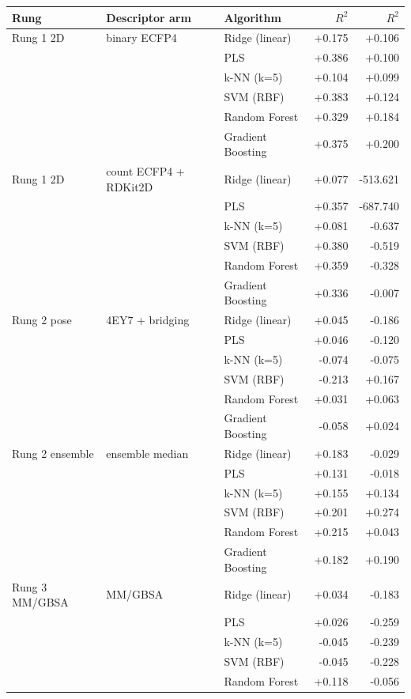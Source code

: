 \begin{tabular}{lllrr}
\toprule
Rung & Descriptor arm & Algorithm & \framingA{} $R^2$ & \framingB{} $R^2$ \\
\midrule
Rung 1 2D & binary ECFP4 & Ridge (linear) & +0.175 & +0.106 \\
 &  & PLS & +0.386 & +0.100 \\
 &  & k-NN (k=5) & +0.104 & +0.099 \\
 &  & SVM (RBF) & +0.383 & +0.124 \\
 &  & Random Forest & +0.329 & +0.184 \\
 &  & Gradient Boosting & +0.375 & +0.200 \\
\addlinespace
Rung 1 2D & count ECFP4 + RDKit2D & Ridge (linear) & +0.077 & -513.621 \\
 &  & PLS & +0.357 & -687.740 \\
 &  & k-NN (k=5) & +0.081 & -0.637 \\
 &  & SVM (RBF) & +0.380 & -0.519 \\
 &  & Random Forest & +0.359 & -0.328 \\
 &  & Gradient Boosting & +0.336 & -0.007 \\
\addlinespace
Rung 2 pose & 4EY7 + bridging & Ridge (linear) & +0.045 & -0.186 \\
 &  & PLS & +0.046 & -0.120 \\
 &  & k-NN (k=5) & -0.074 & -0.075 \\
 &  & SVM (RBF) & -0.213 & +0.167 \\
 &  & Random Forest & +0.031 & +0.063 \\
 &  & Gradient Boosting & -0.058 & +0.024 \\
\addlinespace
Rung 2 ensemble & ensemble median & Ridge (linear) & +0.183 & -0.029 \\
 &  & PLS & +0.131 & -0.018 \\
 &  & k-NN (k=5) & +0.155 & +0.134 \\
 &  & SVM (RBF) & +0.201 & +0.274 \\
 &  & Random Forest & +0.215 & +0.043 \\
 &  & Gradient Boosting & +0.182 & +0.190 \\
\addlinespace
Rung 3 MM/GBSA & MM/GBSA & Ridge (linear) & +0.034 & -0.183 \\
 &  & PLS & +0.026 & -0.259 \\
 &  & k-NN (k=5) & -0.045 & -0.239 \\
 &  & SVM (RBF) & -0.045 & -0.228 \\
 &  & Random Forest & +0.118 & -0.056 \\

\end{tabular}
